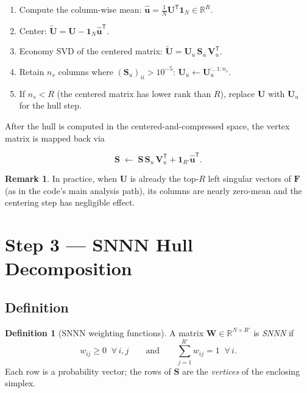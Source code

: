 \documentclass[11pt]{article}
\theoremstyle{definition}
\newtheorem{definition}{Definition}[section]
\newtheorem{remark}{Remark}[section]
\theoremstyle{plain}
\newcommand{\R}{\mathbb{R}}
\newcommand{\mat}[1]{\mathbf{#1}}
\newcommand{\ones}{\mathbf{1}}
\newcommand{\T}{\mathsf{T}}
\begin{document}
\begin{enumerate}
  \item Compute the column-wise mean:
    $\hat{\bm{u}} = \frac{1}{N}\mat{U}^\T\ones_N \in \R^R$.
  \item Center: $\tilde{\mat{U}} = \mat{U} - \ones_N \hat{\bm{u}}^\T$.
  \item Economy SVD of the centered matrix:
    $\tilde{\mat{U}} = \mat{U}_u\,\mat{S}_u\,\mat{V}_u^\T$.
  \item Retain $n_s$ columns where $(\mat{S}_u)_{ii} > 10^{-5}$:
    $\mat{U}_u \leftarrow \mat{U}_u^{:,\,1:n_s}$.
  \item If $n_s < R$ (the centered matrix has lower rank than $R$),
    replace $\mat{U}$ with $\mat{U}_u$ for the hull step.
\end{enumerate}

After the hull is computed in the centered-and-compressed space, the
vertex matrix is mapped back via

\begin{equation}
  \mat{S} \;\leftarrow\; \mat{S}\,\mat{S}_u\,\mat{V}_u^\T
  + \ones_{R'}\hat{\bm{u}}^\T.
  \label{eq:back_transform}
\end{equation}

\begin{remark}
  In practice, when $\mat{U}$ is already the top-$R$ left singular vectors
  of $\mat{F}$ (as in the code's main analysis path), its columns are nearly
  zero-mean and the centering step has negligible effect.
\end{remark}


\section{Step 3 --- SNNN Hull Decomposition}

\subsection{Definition}

\begin{definition}[SNNN weighting functions]
  A matrix $\mat{W} \in \R^{N \times R'}$ is \emph{SNNN} if
  \begin{equation}
    w_{ij} \ge 0 \;\;\forall\, i,j
    \qquad \text{and} \qquad
    \sum_{j=1}^{R'} w_{ij} = 1 \;\;\forall\, i.
    \label{eq:snnn}
  \end{equation}
  Each row is a probability vector; the rows of $\mat{S}$ are the
  \emph{vertices} of the enclosing simplex.
\end{definition}
\end{document}
